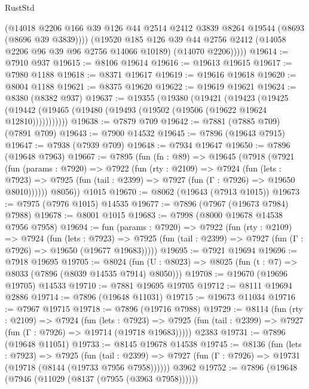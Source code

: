 \begin{lexlean}{RustStd}
\begin{coremodule}
            (@14018
              @2206
              @166
              @39
              @126
              @44
              @2514
              @2412
              @3839
              @8264
              @19544
              (@8693 (@8696 @39 @3839))))
          (@19520
            @185
            @126
            @39
            @44
            @2756
            @2412
            (@14058 @2206 @96 @39 @96 @2756 @14066 @10189)
            (@14070 @2206)))))
@19614 := @7910 @937
@19615 := @8106 @19614
@19616 := @19613 @19615
@19617 := @7980 @1188
@19618 := @8371 @19617
@19619 := @19616 @19618
@19620 := @8004 @1188
@19621 := @8375 @19620
@19622 := @19619 @19621
@19624 := @8380 (@8382 @937)
@19637 := @19355
    (@19380
      (@19421
        (@19423
          (@19425 (@19442 (@19465 (@19480 (@19493 (@19502 (@19506 (@19622 @19624 @12810)))))))))))
@19638 := @7879 @709
@19642 := @7881 (@7885 @709) (@7891 @709)
@19643 := @7900 @14532
@19645 := @7896 (@19643 @7915)
@19647 := @7938 (@7939 @709)
@19648 := @7934 @19647
@19650 := @7896 (@19648 @7963)
@19667 := @7895
    (fun (fn : @89) =>
    @19645
      (@7918
        (@7921
          (fun (params : @7920) =>
          @7922
            (fun (rty : @2109) =>
            @7924
              (fun (lets : @7923) =>
              @7925 (fun (tail : @2399) => @7927 (fun (Γ : @7926) => @19650 @8010))))))
        @8056))
    @1015
@19670 := @8062 (@19643 (@7913 @1015))
@19673 := @7975 (@7976 @1015) @14535
@19677 := @7896 (@7967 (@19673 @7984) @7988)
@19678 := @8001 @1015
@19683 := @7998 (@8000 @19678 @14538 @7956 @7958)
@19694 := fun (params : @7920) =>
  @7922
    (fun (rty : @2109) =>
    @7924
      (fun (lets : @7923) =>
      @7925 (fun (tail : @2399) => @7927 (fun (Γ : @7926) => @19650 (@19677 @19683)))))
@19695 := @7921 @19694
@19696 := @7918 @19695
@19705 := @8024
    (fun (U : @8023) => @8025 (fun (t : @7) => @8033 (@7896 (@8039 @14535 @7914) @8050)))
@19708 := @19670 (@19696 @19705) @14533
@19710 := @7881 @19695 @19705
@19712 := @8111 @19694 @2886
@19714 := @7896 (@19648 @11031)
@19715 := @19673 @11034
@19716 := @7967 @19715
@19718 := @7896 (@19716 @7988)
@19729 := @8114
    (fun (rty : @2109) =>
    @7924
      (fun (lets : @7923) =>
      @7925 (fun (tail : @2399) => @7927 (fun (Γ : @7926) => @19714 (@19718 @19683)))))
    @2383
@19731 := @7896 (@19648 @11051)
@19733 := @8145 @19678 @14538
@19745 := @8136
    (fun (lets : @7923) =>
    @7925
      (fun (tail : @2399) =>
      @7927 (fun (Γ : @7926) => @19731 (@19718 (@8144 (@19733 @7956 @7958))))))
    @3962
@19752 := @7896 (@19648 (@7946 (@11029 (@8137 (@7955 (@3963 @7958))))))

\end{coremodule}
\end{lexlean}
